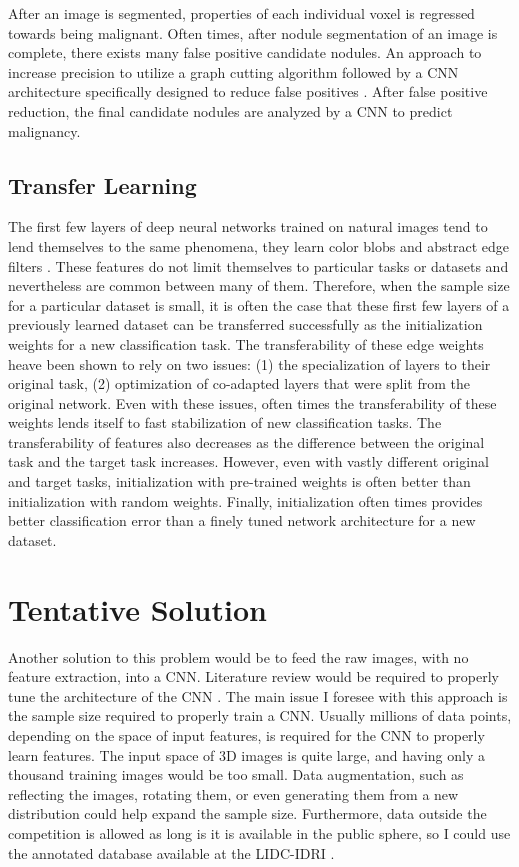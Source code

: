 \documentclass[conference,11pt]{IEEEtran}
\begin{document}
After an image is segmented, properties of each individual voxel is regressed towards being malignant. Often times, after nodule segmentation of an image is complete, there exists many false positive candidate nodules. An approach to increase precision to utilize a graph cutting algorithm followed by a CNN architecture specifically designed to reduce false positives \cite{sun_automatic_2017}. After false positive reduction, the final candidate nodules are analyzed by a CNN to predict malignancy.

\subsection{Transfer Learning}

The first few layers of deep neural networks trained on natural images tend to lend themselves to the same phenomena, they learn color blobs and abstract edge filters \cite{yosinski_how_2014}. These features do not limit themselves to particular tasks or datasets and nevertheless are common between many of them. Therefore, when the sample size for a particular dataset is small, it is often the case that these first few layers of a previously learned dataset can be transferred successfully as the initialization weights for a new classification task. The transferability of these edge weights heave been shown to rely on two issues: (1) the specialization of layers to their original task, (2) optimization of co-adapted layers that were split from the original network. Even with these issues, often times the transferability of these weights lends itself to fast stabilization of new classification tasks. The transferability of features also decreases as the difference between the original task and the target task increases. However, even with vastly different original and target tasks, initialization with pre-trained weights is often better than initialization with random weights. Finally, initialization often times provides better classification error than a finely tuned network architecture for a new dataset.

\section{Tentative Solution}

Another solution to this problem would be to feed the raw images, with no feature extraction, into a CNN. Literature review would be required to properly tune the architecture of the CNN \cite{litjens_survey_2017}. The main issue I foresee with this approach is the sample size required to properly train a CNN. Usually millions of data points, depending on the space of input features, is required for the CNN to properly learn features. The input space of 3D images is quite large, and having only a thousand training images would be too small. Data augmentation, such as reflecting the images, rotating them, or even generating them from a new distribution could help expand the sample size. Furthermore, data outside the competition is allowed as long is it is available in the public sphere, so I could use the annotated database available at the LIDC-IDRI \cite{armato_lung_2011}.
\end{document}

